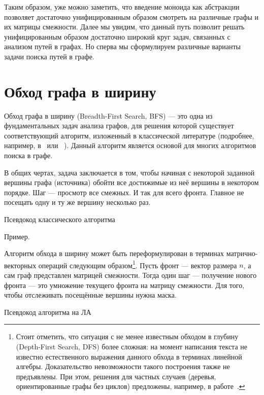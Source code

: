 Таким образом, уже можно заметить, что введение моноида как абстракции позволяет достаточно унифицированным образом смотреть на различные графы и их матрицы смежности. Далее мы увидим, что данный путь позволит решать унифицированным образом достаточно широкий круг задач, связанных с анализом путей в графах. Но сперва мы сформулируем различные варианты задачи поиска путей в графе. %


\section{Обход графа в ширину}

Обход графа в ширину (Breadth-First Search, BFS) --- это одна из фундаментальных задач анализа графов, для решения которой существует соответствующий алгоритм, изложенный в классической литературе (подробнее, например, в~\cite{} или ~\cite{}).
Данный алгоритм является основой для многих алгоритмов поиска в графе.

В общих чертах, задача заключается в том, чтобы начиная с некоторой заданной вершины графа (источника) обойти все достижимые из неё вершины в некотором порядке. 
Шаг --- просмотр все смежных. И так для всего фронта. Главное не посещать одну и ту же вершину несколько раз.

Псевдокод классического алгоритма

Пример.

Алгоритм обхода в ширину может быть переформулирован в терминах матрично-векторных операций следующим образом\footnote{
Стоит отметить, что ситуация с не менее известным обходом в глубину (Depth-First Search, DFS) более сложная:
на момент написания текста не известно естественного выражения данного обхода в терминах линейной алгебры.
Доказательство невозможности такого построения также не предъявлены.
При этом, решения для частных случаев (деревья, ориентированные графы без циклов) предложены, например, в работе~\cite{10.1145/3315454.3329962}.}.
Пусть фронт --- вектор размера $n$, а сам граф представлен матрицей смежности. 
Тогда один шаг --- получение нового фронта --- это умножение текущего фронта на матрицу смежности. 
Для того, чтобы отслеживать посещённые вершины нужна маска. 

Псевдокод алгоритма на ЛА

